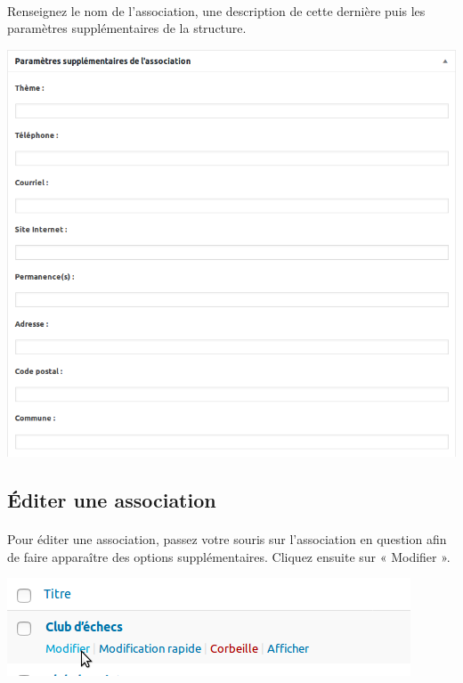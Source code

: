 \documentclass[10pt,a4paper]{article}
\begin{document}
\paragraph{}Renseignez le nom de l'association, une description de cette dernière puis les paramètres supplémentaires de la structure.
\begin{center}
\includegraphics[scale=0.3]{img/0302.png}
\end{center}
\subsection{Éditer une association}
\paragraph{}Pour éditer une association, passez votre souris sur l’association en question afin de faire apparaître des options supplémentaires. Cliquez ensuite sur « Modifier ».
\begin{center}
\includegraphics[scale=0.3]{img/0303.png}
\end{center}
\end{document}
